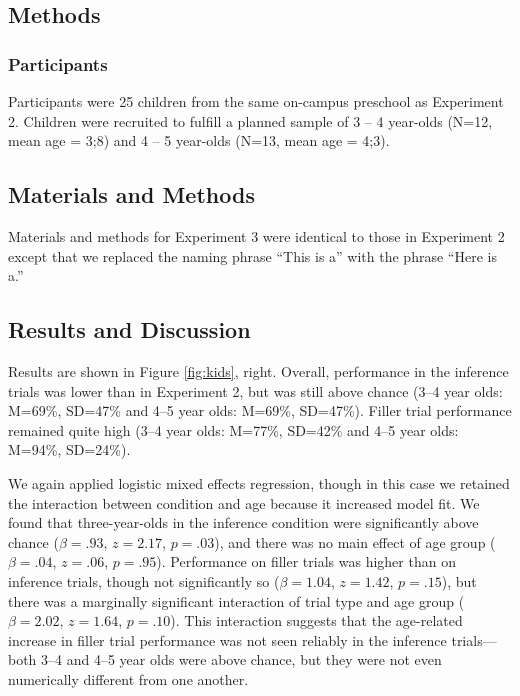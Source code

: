\documentclass[review]{elsarticle}
\begin{document}
\subsection{Methods}

\subsubsection{Participants}

Participants were 25 children from the same on-campus preschool as Experiment 2. Children were recruited to fulfill a planned sample of 3 -- 4 year-olds (N=12, mean age = 3;8) and 4 -- 5 year-olds (N=13, mean age = 4;3).

\subsection{Materials and Methods}

Materials and methods for Experiment 3 were identical to those in Experiment 2 except that we replaced the naming phrase ``This is a'' with the phrase ``Here is a.'' 

\subsection{Results and Discussion}

Results are shown in Figure \ref{fig:kids}, right. Overall, performance in the inference trials was lower than in Experiment 2, but was still above chance (3--4 year olds: M=69\%, SD=47\% and 4--5 year olds: M=69\%, SD=47\%). Filler trial performance remained quite high (3--4 year olds: M=77\%, SD=42\% and 4--5 year olds: M=94\%, SD=24\%). 

We again applied logistic mixed effects regression, though in this case we retained the interaction between condition and age because it increased model fit. We found that three-year-olds in the inference condition were significantly above chance ($\beta = .93$, $z = 2.17$, $p = .03$), and there was no main effect of age group ($\beta = .04$, $z = .06$, $p = .95$). Performance on filler trials was higher than on inference trials, though not significantly so ($\beta = 1.04$, $z = 1.42$, $p = .15$), but there was a marginally significant interaction of trial type and age group ($\beta = 2.02$, $z = 1.64$, $p = .10$). This interaction suggests that the age-related increase in filler trial performance was not seen reliably in the inference trials---both 3--4 and 4--5 year olds were above chance, but they were not even numerically different from one another. 
\end{document}
